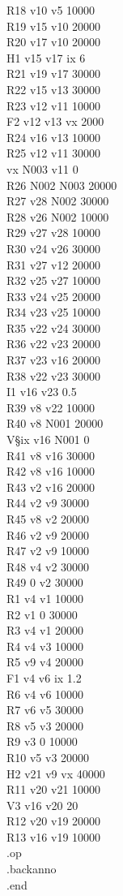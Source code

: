 \documentclass{article}
\begin{document}
R18 v10 v5 10000\\
R19 v15 v10 20000\\
R20 v17 v10 20000\\
H1 v15 v17 ix 6\\
R21 v19 v17 30000\\
R22 v15 v13 30000\\
R23 v12 v11 10000\\
F2 v12 v13 vx 2000\\
R24 v16 v13 10000\\
R25 v12 v11 30000\\
vx N003 v11 0\\
R26 N002 N003 20000\\
R27 v28 N002 30000\\
R28 v26 N002 10000\\
R29 v27 v28 10000\\
R30 v24 v26 30000\\
R31 v27 v12 20000\\
R32 v25 v27 10000\\
R33 v24 v25 20000\\
R34 v23 v25 10000\\
R35 v22 v24 30000\\
R36 v22 v23 20000\\
R37 v23 v16 20000\\
R38 v22 v23 30000\\
I1 v16 v23 0.5\\
R39 v8 v22 10000\\
R40 v8 N001 20000\\
V§ix v16 N001 0\\
R41 v8 v16 30000\\
R42 v8 v16 10000\\
R43 v2 v16 20000\\
R44 v2 v9 30000\\
R45 v8 v2 20000\\
R46 v2 v9 20000\\
R47 v2 v9 10000\\
R48 v4 v2 30000\\
R49 0 v2 30000\\
R1 v4 v1 10000\\
R2 v1 0 30000\\
R3 v4 v1 20000\\
R4 v4 v3 10000\\
R5 v9 v4 20000\\
F1 v4 v6 ix 1.2\\
R6 v4 v6 10000\\
R7 v6 v5 30000\\
R8 v5 v3 20000\\
R9 v3 0 10000\\
R10 v5 v3 20000\\
H2 v21 v9 vx 40000\\
R11 v20 v21 10000\\
V3 v16 v20 20\\
R12 v20 v19 20000\\
R13 v16 v19 10000\\
.op\\
.backanno\\
.end\\
\end{document}
